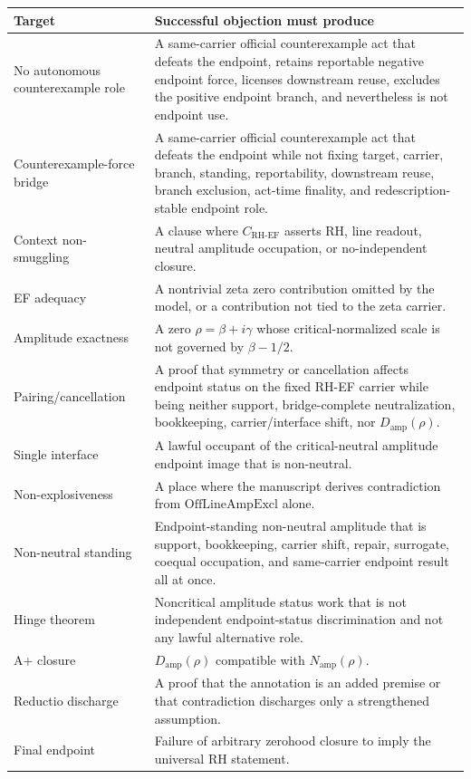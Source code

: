 \documentclass[11pt]{article}
\newcommand{\CRHEF}{C_{\mathrm{RH}\text{-}\mathrm{EF}}}
\newcommand{\OffAmpExcl}{\mathrm{OffLineAmpExcl}}
\newcommand{\Damp}{D_{\mathrm{amp}}}
\newcommand{\Namp}{N_{\mathrm{amp}}}
\begin{document}
\begin{longtable}{L{0.29\textwidth}L{0.64\textwidth}}
\toprule
\textbf{Target} & \textbf{Successful objection must produce}\\
\midrule
No autonomous counterexample role & A same-carrier official counterexample act that defeats the endpoint, retains reportable negative endpoint force, licenses downstream reuse, excludes the positive endpoint branch, and nevertheless is not endpoint use.\\
Counterexample-force bridge & A same-carrier official counterexample act that defeats the endpoint while not fixing target, carrier, branch, standing, reportability, downstream reuse, branch exclusion, act-time finality, and redescription-stable endpoint role.\\
Context non-smuggling & A clause where \(\CRHEF\) asserts RH, line readout, neutral amplitude occupation, or no-independent closure.\\
EF adequacy & A nontrivial zeta zero contribution omitted by the model, or a contribution not tied to the zeta carrier.\\
Amplitude exactness & A zero \(\rho=\beta+i\gamma\) whose critical-normalized scale is not governed by \(\beta-1/2\).\\
Pairing/cancellation & A proof that symmetry or cancellation affects endpoint status on the fixed RH-EF carrier while being neither support, bridge-complete neutralization, bookkeeping, carrier/interface shift, nor \(\Damp(\rho)\).\\
Single interface & A lawful occupant of the critical-neutral amplitude endpoint image that is non-neutral.\\
Non-explosiveness & A place where the manuscript derives contradiction from \(\OffAmpExcl\) alone.\\
Non-neutral standing & Endpoint-standing non-neutral amplitude that is support, bookkeeping, carrier shift, repair, surrogate, coequal occupation, and same-carrier endpoint result all at once.\\
Hinge theorem & Noncritical amplitude status work that is not independent endpoint-status discrimination and not any lawful alternative role.\\
A+ closure & \(\Damp(\rho)\) compatible with \(\Namp(\rho)\).\\
Reductio discharge & A proof that the annotation is an added premise or that contradiction discharges only a strengthened assumption.\\
Final endpoint & Failure of arbitrary zerohood closure to imply the universal RH statement.\\

\end{longtable}
\end{document}

